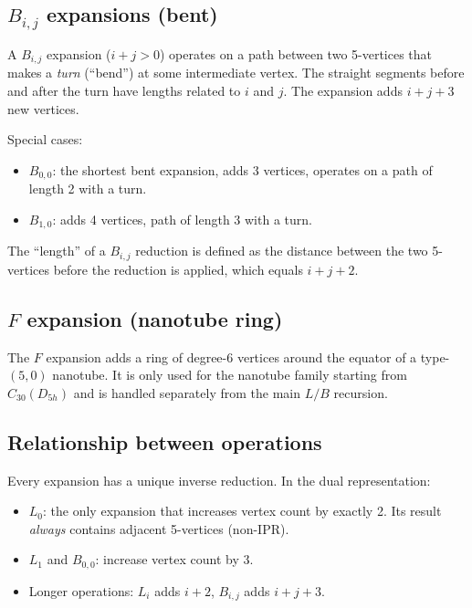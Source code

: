 \documentclass[11pt,a4paper]{article}
\theoremstyle{definition}
\begin{document}
\subsection{\texorpdfstring{$B_{i,j}$}{B\_{i,j}} expansions (bent)}

A $B_{i,j}$ expansion ($i+j > 0$) operates on a path between two
5-vertices that makes a \emph{turn} (``bend'') at some intermediate
vertex.  The straight segments before and after the turn have lengths
related to $i$ and $j$.  The expansion adds $i+j+3$ new vertices.

Special cases:
\begin{itemize}[nosep]
  \item $B_{0,0}$: the shortest bent expansion, adds 3 vertices, operates
    on a path of length 2 with a turn.
  \item $B_{1,0}$: adds 4 vertices, path of length 3 with a turn.
\end{itemize}

The ``length'' of a $B_{i,j}$ reduction is defined as the distance
between the two 5-vertices before the reduction is applied, which equals
$i + j + 2$.

\subsection{\texorpdfstring{$F$}{F} expansion (nanotube ring)}

The $F$ expansion adds a ring of degree-6 vertices around the equator
of a type-$(5,0)$ nanotube.  It is only used for the nanotube family
starting from $C_{30}(D_{5h})$ and is handled separately from the main
$L/B$ recursion.

\subsection{Relationship between operations}

Every expansion has a unique inverse reduction.  In the dual
representation:
\begin{itemize}[nosep]
  \item $L_0$: the only expansion that increases vertex count by exactly 2.
    Its result \emph{always} contains adjacent 5-vertices (non-IPR).
  \item $L_1$ and $B_{0,0}$: increase vertex count by 3.
  \item Longer operations: $L_i$ adds $i+2$, $B_{i,j}$ adds $i+j+3$.
\end{itemize}
\end{document}
